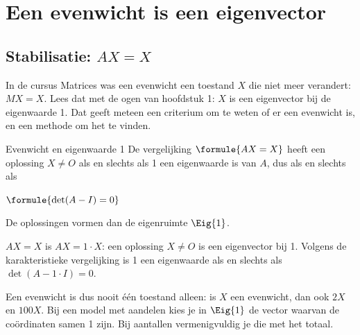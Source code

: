 \begin{oefeningen}[Start]

\end{oefeningen}


\section{Een evenwicht is een eigenvector}

\subsection{Stabilisatie: \texorpdfstring{$AX = X$}{AX = X}}

In de cursus Matrices was een evenwicht een toestand $X$ die niet meer verandert: $MX = X$. Lees dat met de ogen van hoofdstuk 1: $X$ is een eigenvector bij de eigenwaarde 1. Dat geeft meteen een criterium om te weten of er een evenwicht is, en een methode om het te vinden.

\begin{theorie}
\begin{stelling}{Evenwicht en eigenwaarde 1}
De vergelijking $\formule{AX = X}$ heeft een oplossing $X \neq O$ als en slechts als 1 een eigenwaarde is van $A$, dus als en slechts als

\vspace{1mm}
\qquad $\formule{\det(A - I) = 0}$

\vspace{1mm}
De oplossingen vormen dan de eigenruimte $\Eig{1}$.
\end{stelling}

\begin{bewijs}
$AX = X$ is $AX = 1 \cdot X$: een oplossing $X \neq O$ is een eigenvector bij 1. Volgens de karakteristieke vergelijking is 1 een eigenwaarde als en slechts als $\det(A - 1 \cdot I) = 0$.
\end{bewijs}
\end{theorie}

Een evenwicht is dus nooit één toestand alleen: is $X$ een evenwicht, dan ook $2X$ en $100X$. Bij een model met aandelen kies je in $\Eig{1}$ de vector waarvan de coördinaten samen 1 zijn. Bij aantallen vermenigvuldig je die met het totaal.

